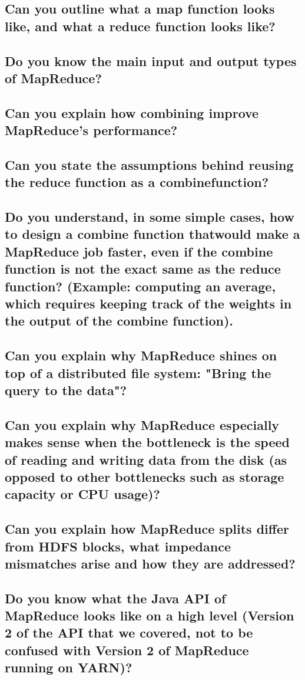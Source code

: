 \documentclass{article}
\begin{document}
\subsection{Can you outline what a map function looks like, and what a reduce function looks like?}
\subsection{Do you know the main input and output types of MapReduce?}
\subsection{Can you explain how combining improve MapReduce's performance?}
\subsection{Can you state the assumptions behind reusing the reduce function as a combinefunction?}
\subsection{Do you understand, in some simple cases, how to design a combine function thatwould make a MapReduce job faster, even if the combine function is not the exact same as the reduce function? (Example: computing an average, which requires keeping track of the weights in the output of the combine function).}
\subsection{Can you explain why MapReduce shines on top of a distributed file system: "Bring the query to the data"?}
\subsection{Can you explain why MapReduce especially makes sense when the bottleneck is the speed of reading and writing data from the disk (as opposed to other bottlenecks such as storage capacity or CPU usage)?}
\subsection{Can you explain how MapReduce splits differ from HDFS blocks, what impedance mismatches arise and how they are addressed?}
\subsection{Do you know what the Java API of MapReduce looks like on a high level (Version 2 of the API that we covered, not to be confused with Version 2 of MapReduce running on YARN)?}
\end{document}
